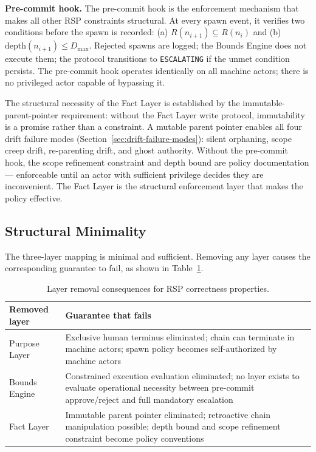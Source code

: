 \medskip
\noindent\textbf{Pre-commit hook.} The pre-commit hook is the enforcement mechanism that makes all other RSP constraints structural. At every spawn event, it verifies two conditions before the spawn is recorded: (a) $R(n_{i+1}) \subseteq R(n_i)$ and (b) $\mathrm{depth}(n_{i+1}) \leq D_{\mathrm{max}}$. Rejected spawns are logged; the Bounds Engine does not execute them; the protocol transitions to \texttt{ESCALATING} if the unmet condition persists. The pre-commit hook operates identically on all machine actors; there is no privileged actor capable of bypassing it.

The structural necessity of the Fact Layer is established by the immutable-parent-pointer requirement: without the Fact Layer write protocol, immutability is a promise rather than a constraint. A mutable parent pointer enables all four drift failure modes (Section~\ref{sec:drift-failure-modes}): silent orphaning, scope creep drift, re-parenting drift, and ghost authority. Without the pre-commit hook, the scope refinement constraint and depth bound are policy documentation --- enforceable until an actor with sufficient privilege decides they are inconvenient. The Fact Layer is the structural enforcement layer that makes the policy effective.

\subsection{Structural Minimality}
\label{sec:rs-minimality}

The three-layer mapping is minimal and sufficient. Removing any layer causes the corresponding guarantee to fail, as shown in Table~\ref{tab:layer-minimality-rs}.

\begin{table}[h]
\centering
\begin{tabular}{p{3.2cm} p{4.8cm}}
\toprule
\textbf{Removed layer} & \textbf{Guarantee that fails} \\
\midrule
Purpose Layer & Exclusive human terminus eliminated; chain can terminate in machine actors; spawn policy becomes self-authorized by machine actors \\
Bounds Engine & Constrained execution evaluation eliminated; no layer exists to evaluate operational necessity between pre-commit approve/reject and full mandatory escalation \\
Fact Layer & Immutable parent pointer eliminated; retroactive chain manipulation possible; depth bound and scope refinement constraint become policy conventions \\
\bottomrule
\end{tabular}
\caption{Layer removal consequences for RSP correctness properties.}
\label{tab:layer-minimality-rs}
\end{table}

